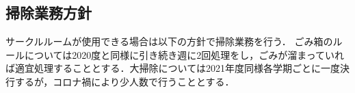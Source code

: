 \subsection*{掃除業務方針}


サークルルームが使用できる場合は以下の方針で掃除業務を行う．
ごみ箱のルールについては2020度と同様に引き続き週に2回処理をし，ごみが溜まっていれば適宜処理することとする．大掃除については2021年度同様各学期ごとに一度決行するが，コロナ禍により少人数で行うこととする．
